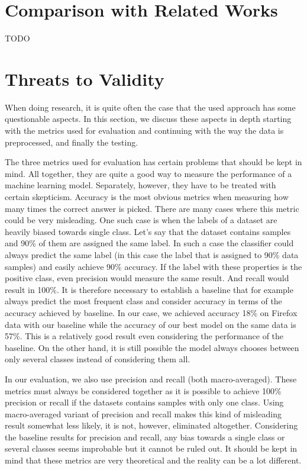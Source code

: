 \section{Comparison with Related Works}

TODO

\section{Threats to Validity}

When doing research, it is quite often the case that the used approach has some questionable aspects. In this section, we discuss these aspects in depth starting with the metrics used for evaluation and continuing with the way the data is preprocessed, and finally the testing.

The three metrics used for evaluation has certain problems that should be kept in mind. All together, they are quite a good way to measure the performance of a machine learning model. Separately, however, they have to be treated with certain skepticism. Accuracy is the most obvious metrics when measuring how many times the correct answer is picked. There are many cases where this metric could be very misleading. One such case is when the labels of a dataset are heavily biased towards single class. Let's say that the dataset contains samples and 90\% of them are assigned the same label. In such a case the classifier could always predict the same label (in this case the label that is assigned to 90\% data samples) and easily achieve 90\% accuracy. If the label with these properties is the positive class, even precision would measure the same result. And recall would result in 100\%. It is therefore necessary to establish a baseline that for example always predict the most frequent class and consider accuracy in terms of the accuracy achieved by baseline. In our case, we achieved accuracy 18\% on Firefox data with our baseline while the accuracy of our best model on the same data is 57\%. This is a relatively good result even considering the performance of the baseline. On the other hand, it is still possible the model always chooses between only several classes instead of considering them all. 

In our evaluation, we also use precision and recall (both macro-averaged). These metrics must always be considered together as it is possible to achieve 100\% precision or recall if the datasets contains samples with only one class. Using macro-averaged variant of precision and recall makes this kind of misleading result somewhat less likely, it is not, however, eliminated altogether. Considering the baseline results for precision and recall, any bias towards a single class or several classes seems improbable but it cannot be ruled out. It should be kept in mind that these metrics are very theoretical and the reality can be a lot different.

